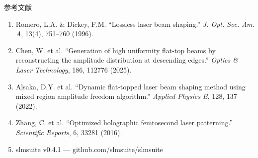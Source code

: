 \documentclass[10pt,aspectratio=43]{beamer}
\begin{document}
\begin{frame}{参考文献}
  \begin{enumerate}
    \item Romero, L.A. \& Dickey, F.M. ``Lossless laser beam shaping.''
          \textit{J. Opt. Soc. Am. A}, 13(4), 751--760 (1996).

    \item Chen, W. et al. ``Generation of high uniformity flat-top beams by
          reconstructing the amplitude distribution at descending edges.''
          \textit{Optics \& Laser Technology}, 186, 112776 (2025).

    \item Alsaka, D.Y. et al. ``Dynamic flat-topped laser beam shaping method
          using mixed region amplitude freedom algorithm.''
          \textit{Applied Physics B}, 128, 137 (2022).

    \item Zhang, C. et al. ``Optimized holographic femtosecond laser patterning.''
          \textit{Scientific Reports}, 6, 33281 (2016).

    \item slmsuite v0.4.1 --- github.com/slmsuite/slmsuite
  \end{enumerate}
\end{frame}
\end{document}

